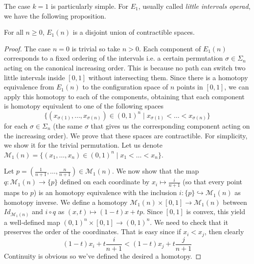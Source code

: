 \documentclass[TFM.tex]{subfiles}
\begin{document}
The case $k=1$ is particularly simple. For $E_1$, usually called \emph{little intervals operad}, we have the following proposition.

\begin{prop}\label{E1}
For all $n\geq 0$, $E_1(n)$ is a disjoint union of contractible spaces.
\end{prop}
\begin{proof}
The case $n=0$ is trivial so take $n>0$. Each component of $E_1(n)$ corresponds to a fixed ordering of the intervals i.e. a certain permutation $\sigma\in\Sigma_n$ acting on the canonical increasing order. This is because no path can switch two little intervals inside $[0,1]$ without intersecting them. Since there is a homotopy equivalence from $E_1(n)$ to the configuration space of $n$ points in $[0,1]$, we can apply this homotopy to each of the components, obtaining that each component is homotopy equivalent to one of the following spaces
\[
\{(x_{\sigma(1)},\dots, x_{\sigma(n)})\in (0,1)^n\mid x_{\sigma(1)}<\dots< x_{\sigma(n)}\}
\]
for each $\sigma\in\Sigma_n$ (the same $\sigma$ that gives us the corresponding component acting on the increasing order).
 We prove that these spaces are contractible. For simplicity, we show it for the trivial permutation. Let us denote $\mathcal{M}_1(n)=\{(x_{1},\dots, x_{n})\in (0,1)^n\mid x_{1}<\dots< x_{n}\}$.

 Let $p=\left(\frac{1}{n+1},\dots, \frac{n}{n+1}\right)\in \mathcal{M}_1(n)$.  We now show that the map $q:\mathcal{M}_1(n)\to \{p\}$ defined on each coordinate by $x_{i}\mapsto \frac{i}{n+1}$ (so that every point maps to $p$) is an homotopy equivalence with the inclusion $i:\{p\}\hookrightarrow \mathcal{M}_1(n)$ as homotopy inverse. We define a homotopy $\mathcal{M}_1(n)\times [0,1]\to \mathcal{M}_1(n)$ between $Id_{\mathcal{M}_1(n)}$ and $i\circ q$ as $(x,t)\mapsto (1-t)x+tp$. Since $[0,1]$ is convex, this yield a well-defined map $(0,1)^n\times [0,1]\to (0,1)^n$. We need to check that it preserves the order of the coordinates. 
 That is easy since if $x_{i}<x_{j}$, then clearly 
\[
(1-t)x_{i}+t\frac{i}{n+1}<(1-t)x_{j}+t\frac{j}{n+1}
\] 
Continuity is obvious so we've defined the desired a homotopy.
\end{proof}
\end{document}
